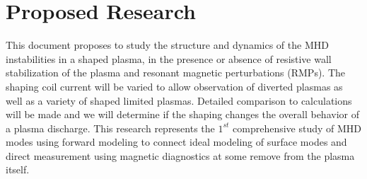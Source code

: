 \documentclass[aps,prl,twocolumn,superscriptaddress,groupedaddress]{revtex4}  %
\begin{document}

\section{Proposed Research}
	This document proposes to study the structure and dynamics of the MHD instabilities in a shaped plasma, in the presence or absence of resistive wall  stabilization of the plasma and resonant magnetic perturbations (RMPs).  The shaping coil current will be varied to allow observation of diverted plasmas as well as a variety of shaped limited plasmas.  Detailed comparison to calculations will be made and we will determine if the shaping changes the overall behavior of a plasma discharge.  This research represents the $1^{st}$ comprehensive study of MHD modes using forward modeling to connect ideal modeling of surface modes and direct measurement using magnetic diagnostics at some remove from the plasma itself.\par
\end{document}
